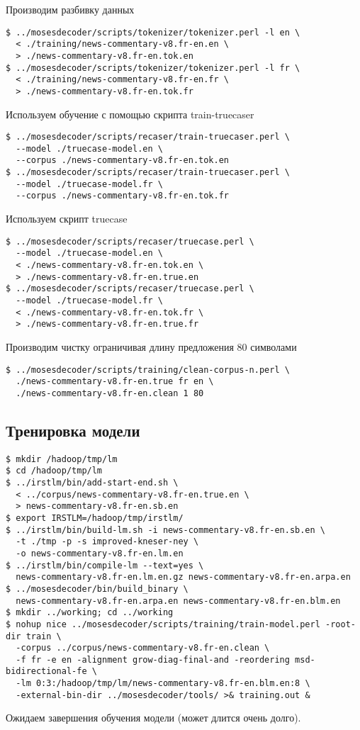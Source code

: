 Производим разбивку данных
\begin{lstlisting}
$ ../mosesdecoder/scripts/tokenizer/tokenizer.perl -l en \
  < ./training/news-commentary-v8.fr-en.en \
  > ./news-commentary-v8.fr-en.tok.en
$ ../mosesdecoder/scripts/tokenizer/tokenizer.perl -l fr \
  < ./training/news-commentary-v8.fr-en.fr \
  > ./news-commentary-v8.fr-en.tok.fr
\end{lstlisting}

Используем обучение с помощью скрипта train-truecaser
\begin{lstlisting}
$ ../mosesdecoder/scripts/recaser/train-truecaser.perl \
  --model ./truecase-model.en \
  --corpus ./news-commentary-v8.fr-en.tok.en
$ ../mosesdecoder/scripts/recaser/train-truecaser.perl \
  --model ./truecase-model.fr \
  --corpus ./news-commentary-v8.fr-en.tok.fr
\end{lstlisting}

Используем скрипт truecase
\begin{lstlisting}
$ ../mosesdecoder/scripts/recaser/truecase.perl \
  --model ./truecase-model.en \
  < ./news-commentary-v8.fr-en.tok.en \
  > ./news-commentary-v8.fr-en.true.en
$ ../mosesdecoder/scripts/recaser/truecase.perl \
  --model ./truecase-model.fr \
  < ./news-commentary-v8.fr-en.tok.fr \
  > ./news-commentary-v8.fr-en.true.fr
\end{lstlisting}

Производим чистку ограничивая длину предложения 80 символами
\begin{lstlisting}
$ ../mosesdecoder/scripts/training/clean-corpus-n.perl \
  ./news-commentary-v8.fr-en.true fr en \
  ./news-commentary-v8.fr-en.clean 1 80
\end{lstlisting}

\subsection{Тренировка модели}
\begin{lstlisting}
$ mkdir /hadoop/tmp/lm
$ cd /hadoop/tmp/lm
$ ../irstlm/bin/add-start-end.sh \
  < ../corpus/news-commentary-v8.fr-en.true.en \
  > news-commentary-v8.fr-en.sb.en
$ export IRSTLM=/hadoop/tmp/irstlm/
$ ../irstlm/bin/build-lm.sh -i news-commentary-v8.fr-en.sb.en \
  -t ./tmp -p -s improved-kneser-ney \
  -o news-commentary-v8.fr-en.lm.en
$ ../irstlm/bin/compile-lm --text=yes \
  news-commentary-v8.fr-en.lm.en.gz news-commentary-v8.fr-en.arpa.en
$ ../mosesdecoder/bin/build_binary \
  news-commentary-v8.fr-en.arpa.en news-commentary-v8.fr-en.blm.en
$ mkdir ../working; cd ../working
$ nohup nice ../mosesdecoder/scripts/training/train-model.perl -root-dir train \
  -corpus ../corpus/news-commentary-v8.fr-en.clean \
  -f fr -e en -alignment grow-diag-final-and -reordering msd-bidirectional-fe \
  -lm 0:3:/hadoop/tmp/lm/news-commentary-v8.fr-en.blm.en:8 \
  -external-bin-dir ../mosesdecoder/tools/ >& training.out &
\end{lstlisting}
Ожидаем завершения обучения модели (может длится очень долго).

